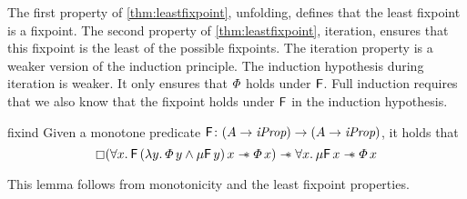 \documentclass[thesis.tex]{subfiles}
\begin{document}
\noindent The first property of \cref*{thm:leastfixpoint}, unfolding, defines that the least fixpoint is a fixpoint. The second property of \cref*{thm:leastfixpoint}, iteration, ensures that this fixpoint is the least of the possible fixpoints. The iteration property is a weaker version of the induction principle. The induction hypothesis during iteration is weaker. It only ensures that $\varPhi$ holds under $\textsf{\upshape F}$. Full induction requires that we also know that the fixpoint holds under $\textsf{\upshape F}$ in the induction hypothesis.
\begin{lemma}{}{fixind}
    Given a monotone predicate $\textsf{\upshape F}\colon (A \to \textit{iProp}) \to (A \to \textit{iProp})$, it holds that
    \[\always(\All\var.\hopred\,(\Lam\varB. \pred\,\varB \land \lfp\hopred\,\varB)\,\var \wand \pred\,\var) \wand \All\var. \lfp\hopred\,\var \wand \pred\,\var\]
\end{lemma}
This lemma follows from monotonicity and the least fixpoint properties.
\end{document}

